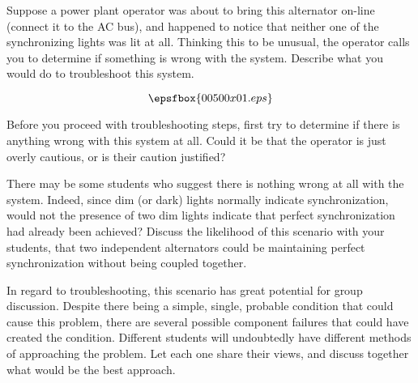 

Suppose a power plant operator was about to bring this alternator on-line (connect it to the AC bus), and happened to notice that neither one of the synchronizing lights was lit at all.  Thinking this to be unusual, the operator calls you to determine if something is wrong with the system.  Describe what you would do to troubleshoot this system.

$$\epsfbox{00500x01.eps}$$







Before you proceed with troubleshooting steps, first try to determine if there is anything wrong with this system at all.  Could it be that the operator is just overly cautious, or is their caution justified?







There may be some students who suggest there is nothing wrong at all with the system.  Indeed, since dim (or dark) lights normally indicate synchronization, would not the presence of two dim lights indicate that perfect synchronization had already been achieved?  Discuss the likelihood of this scenario with your students, that two independent alternators could be maintaining perfect synchronization without being coupled together.

In regard to troubleshooting, this scenario has great potential for group discussion.  Despite there being a simple, single, probable condition that could cause this problem, there are several possible component failures that could have created the condition.  Different students will undoubtedly have different methods of approaching the problem.  Let each one share their views, and discuss together what would be the best approach.




